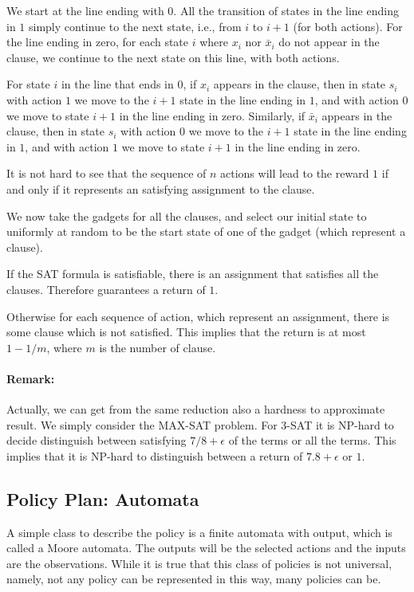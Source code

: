 We start at the line ending with $0$. All the transition of states
in the line ending in $1$ simply continue to the next state, i.e.,
from $i$ to $i+1$ (for both actions). For the line ending in zero,
for each state $i$ where $x_i$ nor $\bar{x}_i$ do not appear in the
clause, we continue to the next state on this line, with both
actions.

For state $i$ in the line that ends in $0$, if $x_i$ appears
 in the clause, then in state $s_i$ with action $1$ we
move to the $i+1$ state in the line ending in $1$, and with action
$0$ we move to state $i+1$ in the line ending in zero.
%
Similarly, if $\bar{x}_i$ appears in the clause,  then in state
$s_i$ with action $0$ we move to the $i+1$ state in the line ending
in $1$, and with action $1$ we move to state $i+1$ in the line
ending in zero.

It is not hard to see that the sequence of $n$ actions will lead to
the reward $1$ if and only if it represents an satisfying assignment
to the clause.

We now take the gadgets for all the clauses, and select our initial
state to uniformly at random to be the start state of one of the
gadget (which represent a clause).

If the SAT formula is satisfiable, there is an assignment that
satisfies all the clauses. Therefore guarantees a return of $1$.

Otherwise for each sequence of action, which represent an
assignment, there is some clause which is not satisfied. This
implies that the return is at most $1-1/m$, where $m$ is the number
of clause.

\paragraph{Remark:} Actually, we can get from the same reduction
also a hardness to approximate result. We simply consider the
MAX-SAT problem. For 3-SAT it is NP-hard to decide distinguish
between satisfying $7/8+\epsilon$ of the terms or all the terms.
This implies that it is NP-hard to distinguish between a return of
$7.8+\epsilon$ or $1$.

\subsection{Policy Plan: Automata}

A simple class to describe the policy is a finite automata with
output, which is called a Moore automata. The outputs will be the
selected actions and the inputs are the observations. While it is
true that this class of policies is not universal, namely, not any
policy can be represented in this way, many policies can be.

